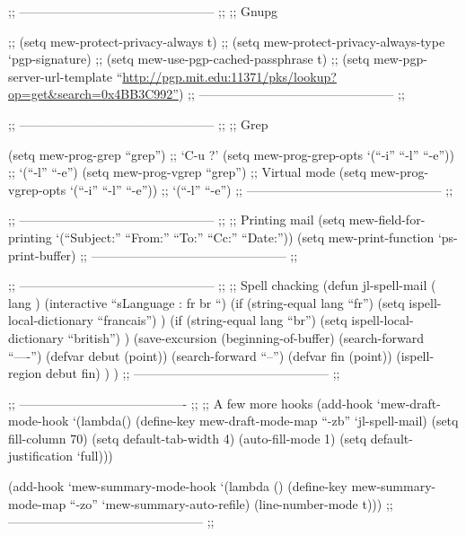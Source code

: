 \documentclass[11pt]{article}
\begin{document}
;; ----------------------------------------------- ;;
;; Gnupg

;; (setq mew-protect-privacy-always t)
;; (setq mew-protect-privacy-always-type `pgp-signature)
;; (setq mew-use-pgp-cached-passphrase t)
;; (setq mew-pgp-server-url-template ``\href{http://pgp.mit.edu:11371/pks/lookup?op=get&search=0x4BB3C992"}{http://pgp.mit.edu:11371/pks/lookup?op=get\&search=0x4BB3C992''})
;; ----------------------------------------------- ;;

;; ----------------------------------------------- ;;
;; Grep

(setq mew-prog-grep ``grep'')                  ;; `C-u ?'
(setq mew-prog-grep-opts `(``-i'' ``-l'' ``-e''))  ;; `(``-l'' ``-e'')
(setq mew-prog-vgrep ``grep'')                 ;; Virtual mode
(setq mew-prog-vgrep-opts `(``-i'' ``-l'' ``-e'')) ;; `(``-l'' ``-e'')
;; ----------------------------------------------- ;;

;; ----------------------------------------------- ;;
;; Printing mail
(setq mew-field-for-printing `(``Subject:'' ``From:'' ``To:'' ``Cc:'' ``Date:''))
(setq mew-print-function `ps-print-buffer)
;; ----------------------------------------------- ;;

;; ----------------------------------------------- ;;
;; Spell chacking
(defun jl-spell-mail ( lang )
  (interactive ``sLanguage  : fr br ``)
  (if (string-equal lang ``fr'')
      (setq ispell-local-dictionary ``francais'')
      )
  (if (string-equal lang ``br'')
      (setq ispell-local-dictionary ``british'')
      )
  (save-excursion
    (beginning-of-buffer)
    (search-forward ``----'')
    (defvar debut (point))
    (search-forward ``--'')
    (defvar fin (point))
    (ispell-region debut fin)
    )
  )
;; ----------------------------------------------- ;;


;; ---------------------------------------- ;;
;; A few more hooks
(add-hook `mew-draft-mode-hook
          `(lambda()
            (define-key mew-draft-mode-map ``\C-zb''   `jl-spell-mail)
            (setq fill-column 70)
            (setq default-tab-width 4)
            (auto-fill-mode 1)
            (setq default-justification `full)))

(add-hook `mew-summary-mode-hook
          `(lambda ()
            (define-key mew-summary-mode-map ``\C-zo''
             `mew-summary-auto-refile)
            (line-number-mode t)))
;; ----------------------------------------------- ;;
\end{document}

